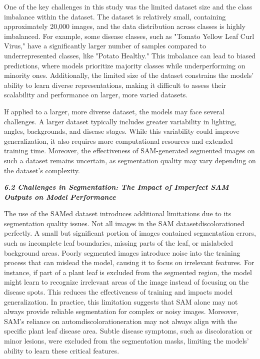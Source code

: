 \documentclass{article}
\begin{document}
One of the key challenges in this study was the limited dataset size and the class imbalance within the dataset. The dataset is relatively small, containing approximately 20,000 images, and the data distribution across classes is highly imbalanced. For example, some disease classes, such as "Tomato Yellow Leaf Curl Virus," have a significantly larger number of samples compared to underrepresented classes, like "Potato Healthy." This imbalance can lead to biased predictions, where models prioritize majority classes while underperforming on minority ones. Additionally, the limited size of the dataset constrains the models' ability to learn diverse representations, making it difficult to assess their scalability and performance on larger, more varied datasets.

If applied to a larger, more diverse dataset, the models may face several challenges. A larger dataset typically includes greater variability in lighting, angles, backgrounds, and disease stages. While this variability could improve generalization, it also requires more computational resources and extended training time. Moreover, the effectiveness of SAM-generated segmented images on such a dataset remains uncertain, as segmentation quality may vary depending on the dataset’s complexity.


\textbf{\textit{6.2 Challenges in Segmentation: The Impact of Imperfect SAM Outputs on Model Performance}}


The use of the SAMed dataset introduces additional limitations due to its segmentation quality issues. Not all images in the SAM datasetdiscolorationed perfectly. A small but significant portion of images contained segmentation errors, such as incomplete leaf boundaries, missing parts of the leaf, or mislabeled background areas. Poorly segmented images introduce noise into the training process that can mislead the model, causing it to focus on irrelevant features. For instance, if part of a plant leaf is excluded from the segmented region, the model might learn to recognize irrelevant areas of the image instead of focusing on the disease spots. This reduces the effectiveness of training and impacts model generalization. In practice, this limitation suggests that SAM alone may not always provide reliable segmentation for complex or noisy images. Moreover, SAM's reliance on automdiscolorationeration may not always align with the specific plant leaf disease area. Subtle disease symptoms, such as discoloration or minor lesions, were excluded from the segmentation masks, limiting the models' ability to learn these critical features. 
\end{document}

